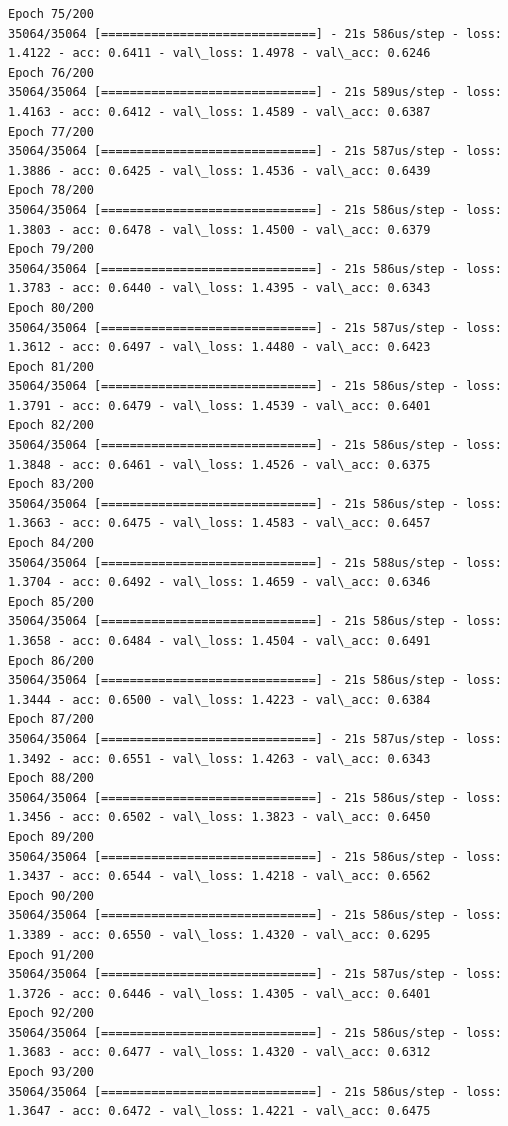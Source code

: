 \documentclass[11pt]{article}
\begin{document}
\begin{Verbatim}[commandchars=\\\{\}]
Epoch 75/200
35064/35064 [==============================] - 21s 586us/step - loss: 1.4122 - acc: 0.6411 - val\_loss: 1.4978 - val\_acc: 0.6246
Epoch 76/200
35064/35064 [==============================] - 21s 589us/step - loss: 1.4163 - acc: 0.6412 - val\_loss: 1.4589 - val\_acc: 0.6387
Epoch 77/200
35064/35064 [==============================] - 21s 587us/step - loss: 1.3886 - acc: 0.6425 - val\_loss: 1.4536 - val\_acc: 0.6439
Epoch 78/200
35064/35064 [==============================] - 21s 586us/step - loss: 1.3803 - acc: 0.6478 - val\_loss: 1.4500 - val\_acc: 0.6379
Epoch 79/200
35064/35064 [==============================] - 21s 586us/step - loss: 1.3783 - acc: 0.6440 - val\_loss: 1.4395 - val\_acc: 0.6343
Epoch 80/200
35064/35064 [==============================] - 21s 587us/step - loss: 1.3612 - acc: 0.6497 - val\_loss: 1.4480 - val\_acc: 0.6423
Epoch 81/200
35064/35064 [==============================] - 21s 586us/step - loss: 1.3791 - acc: 0.6479 - val\_loss: 1.4539 - val\_acc: 0.6401
Epoch 82/200
35064/35064 [==============================] - 21s 586us/step - loss: 1.3848 - acc: 0.6461 - val\_loss: 1.4526 - val\_acc: 0.6375
Epoch 83/200
35064/35064 [==============================] - 21s 586us/step - loss: 1.3663 - acc: 0.6475 - val\_loss: 1.4583 - val\_acc: 0.6457
Epoch 84/200
35064/35064 [==============================] - 21s 588us/step - loss: 1.3704 - acc: 0.6492 - val\_loss: 1.4659 - val\_acc: 0.6346
Epoch 85/200
35064/35064 [==============================] - 21s 586us/step - loss: 1.3658 - acc: 0.6484 - val\_loss: 1.4504 - val\_acc: 0.6491
Epoch 86/200
35064/35064 [==============================] - 21s 586us/step - loss: 1.3444 - acc: 0.6500 - val\_loss: 1.4223 - val\_acc: 0.6384
Epoch 87/200
35064/35064 [==============================] - 21s 587us/step - loss: 1.3492 - acc: 0.6551 - val\_loss: 1.4263 - val\_acc: 0.6343
Epoch 88/200
35064/35064 [==============================] - 21s 586us/step - loss: 1.3456 - acc: 0.6502 - val\_loss: 1.3823 - val\_acc: 0.6450
Epoch 89/200
35064/35064 [==============================] - 21s 586us/step - loss: 1.3437 - acc: 0.6544 - val\_loss: 1.4218 - val\_acc: 0.6562
Epoch 90/200
35064/35064 [==============================] - 21s 586us/step - loss: 1.3389 - acc: 0.6550 - val\_loss: 1.4320 - val\_acc: 0.6295
Epoch 91/200
35064/35064 [==============================] - 21s 587us/step - loss: 1.3726 - acc: 0.6446 - val\_loss: 1.4305 - val\_acc: 0.6401
Epoch 92/200
35064/35064 [==============================] - 21s 586us/step - loss: 1.3683 - acc: 0.6477 - val\_loss: 1.4320 - val\_acc: 0.6312
Epoch 93/200
35064/35064 [==============================] - 21s 586us/step - loss: 1.3647 - acc: 0.6472 - val\_loss: 1.4221 - val\_acc: 0.6475

\end{Verbatim}
\end{document}
